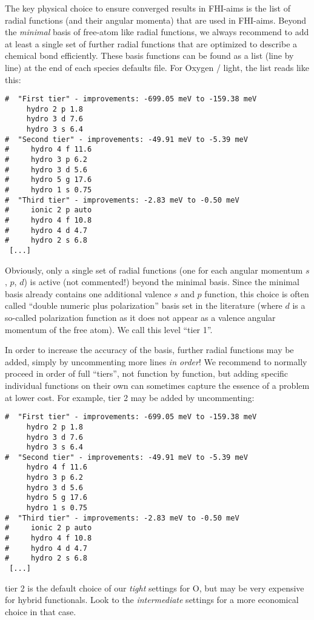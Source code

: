 The key physical choice to ensure converged results in FHI-aims is the list of
radial functions (and their angular momenta) that are used in FHI-aims. Beyond
the \emph{minimal} basis of free-atom like radial functions, we always
recommend to add at least a single set of further radial functions that are
optimized to describe a chemical bond efficiently. These basis functions can
be found as a list (line by line) at the end of each species defaults
file. For Oxygen / light, the list reads like this:
\begin{verbatim}
#  "First tier" - improvements: -699.05 meV to -159.38 meV
     hydro 2 p 1.8
     hydro 3 d 7.6
     hydro 3 s 6.4
#  "Second tier" - improvements: -49.91 meV to -5.39 meV
#     hydro 4 f 11.6
#     hydro 3 p 6.2
#     hydro 3 d 5.6
#     hydro 5 g 17.6
#     hydro 1 s 0.75
#  "Third tier" - improvements: -2.83 meV to -0.50 meV
#     ionic 2 p auto
#     hydro 4 f 10.8
#     hydro 4 d 4.7
#     hydro 2 s 6.8
 [...]
\end{verbatim}
Obviously, only a single set of radial functions (one for each angular
momentum $s$, $p$, $d$) is active (not commented!) beyond the minimal
basis. Since the minimal basis already contains one additional valence $s$
and $p$ function, this choice is often called ``double numeric plus
polarization'' basis set in the literature (where $d$ is a so-called
polarization function as it does not appear as a valence angular momentum of
the free atom). We call this level ``tier 1''. 

In order to increase the accuracy of the basis, further radial functions may
be added, simply by uncommenting more lines \emph{in order}! We
recommend to normally proceed in order of full ``tiers'', not function by
function, but adding specific individual functions on their own
can sometimes capture the essence of a problem at lower cost.  For
example, tier 2 may be added by uncommenting: 
\begin{verbatim}
#  "First tier" - improvements: -699.05 meV to -159.38 meV
     hydro 2 p 1.8
     hydro 3 d 7.6
     hydro 3 s 6.4
#  "Second tier" - improvements: -49.91 meV to -5.39 meV
     hydro 4 f 11.6
     hydro 3 p 6.2
     hydro 3 d 5.6
     hydro 5 g 17.6
     hydro 1 s 0.75
#  "Third tier" - improvements: -2.83 meV to -0.50 meV
#     ionic 2 p auto
#     hydro 4 f 10.8
#     hydro 4 d 4.7
#     hydro 2 s 6.8
 [...]
\end{verbatim}
tier 2 is the default choice of our \emph{tight} settings for O, but
may be very expensive for hybrid functionals. Look to the
\emph{intermediate} settings for a more economical choice in that case.

